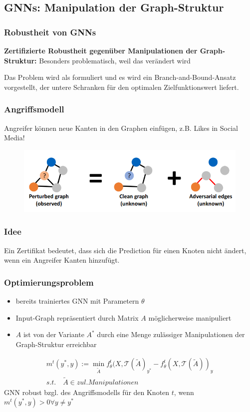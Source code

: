 \documentclass{beamer}
\begin{document}
\subsection{GNNs: Manipulation der Graph-Struktur}

\begin{frame}
  \frametitle{Robustheit von GNNs}
  \textbf{Zertifizierte Robustheit gegenüber Manipulationen der Graph-Struktur:}\newline
  Besonders problematisch, weil das  verändert wird

  Das Problem wird als  formuliert und es wird ein Branch-and-Bound-Ansatz vorgestellt, der
  untere Schranken für den optimalen Zielfunktionswert liefert.
\end{frame}

\begin{frame}
  \frametitle{Angriffsmodell}
  Angreifer können neue Kanten in den Graphen einfügen, z.B. Likes in Social Media!
  \begin{figure}
    \centering
    \includegraphics[width=\textwidth]{img/high_level_graph_pert.png}
    \caption*{ \cite{}}
  \end{figure}
\end{frame}

\begin{frame}
  \frametitle{Idee}
  Ein Zertifikat bedeutet, dass sich die Prediction für einen Knoten nicht ändert, wenn ein Angreifer Kanten hinzufügt.
\end{frame}

\begin{frame}
  \frametitle{Optimierungsproblem}

  \begin{itemize}
    \item bereits trainiertes GNN mit Parametern $\theta$
    \item Input-Graph repräsentiert durch Matrix $A$ möglicherweise manipuliert
    \item $A$ ist von der  Variante $A^{\ast}$ durch eine Menge zulässiger Manipulationen der Graph-Struktur erreichbar
  \end{itemize}

  \begin{gather} 
    m^t (y^*, y) := \min_{\tilde{A}} f_{\theta}^t(X, \mathcal{T}(\tilde{A})_{y^*} - f_{\theta}^t(X, \mathcal{T}(\tilde{A}))_y \nonumber \\
    s.t. \quad \tilde{A} \in zul. Manipulationen \nonumber
\end{gather}
  GNN robust bzgl. des Angriffsmodells für den Knoten $t$, wenn $m^t (y^*, y) > 0 \forall y \neq y^{\ast}$
\end{frame}
\end{document}
